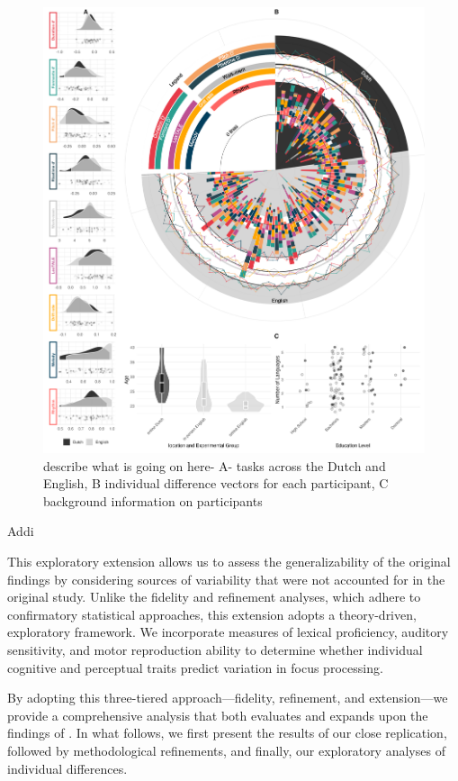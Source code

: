 \clearpage
\begin{figure}[p]  %
    \centering
    \includegraphics[width=\textwidth,height=\textheight,keepaspectratio]{viz/combined_plot_circle.png}
    \caption{describe what is going on here- A- tasks across the Dutch and English, B individual difference vectors for each participant, C background information on participants}
    \label{fig:combined_plot}
\end{figure}
\clearpage


Addi

This exploratory extension allows us to assess the generalizability of the original findings by considering sources of variability that were not accounted for in the original study. Unlike the fidelity and refinement analyses, which adhere to confirmatory statistical approaches, this extension adopts a theory-driven, exploratory framework. We incorporate measures of lexical proficiency, auditory sensitivity, and motor reproduction ability to determine whether individual cognitive and perceptual traits predict variation in focus processing.

By adopting this three-tiered approach—fidelity, refinement, and extension—we provide a comprehensive analysis that both evaluates and expands upon the findings of \citep{Ge2021}. In what follows, we first present the results of our close replication, followed by methodological refinements, and finally, our exploratory analyses of individual differences.

